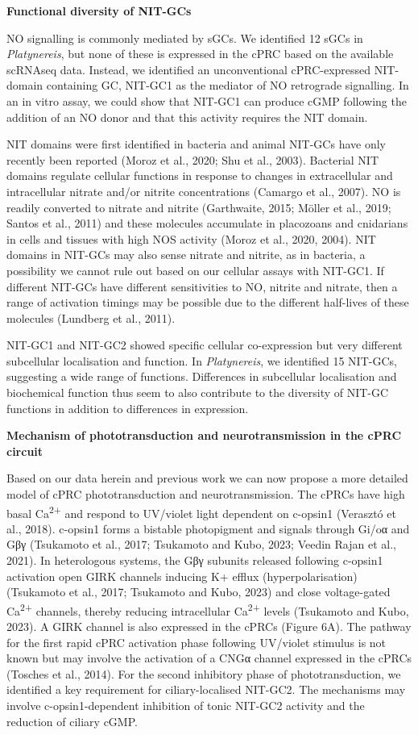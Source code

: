 \documentclass[
  10pt,
  onecolumn]{article}
\begin{document}
\textbf{Functional diversity of NIT-GCs}

NO signalling is commonly mediated by sGCs. We identified 12 sGCs in
\emph{Platynereis}, but none of these is expressed in the cPRC based on
the available scRNAseq data. Instead, we identified an unconventional
cPRC-expressed NIT-domain containing GC, NIT-GC1 as the mediator of NO
retrograde signalling. In an in vitro assay, we could show that NIT-GC1
can produce cGMP following the addition of an NO donor and that this
activity requires the NIT domain.

NIT domains were first identified in bacteria and animal NIT-GCs have
only recently been reported (Moroz et al., 2020; Shu et al., 2003).
Bacterial NIT domains regulate cellular functions in response to changes
in extracellular and intracellular nitrate and/or nitrite concentrations
(Camargo et al., 2007). NO is readily converted to nitrate and nitrite
(Garthwaite, 2015; Möller et al., 2019; Santos et al., 2011) and these
molecules accumulate in placozoans and cnidarians in cells and tissues
with high NOS activity (Moroz et al., 2020, 2004). NIT domains in
NIT-GCs may also sense nitrate and nitrite, as in bacteria, a
possibility we cannot rule out based on our cellular assays with
NIT-GC1. If different NIT-GCs have different sensitivities to NO,
nitrite and nitrate, then a range of activation timings may be possible
due to the different half-lives of these molecules (Lundberg et al.,
2011).

NIT-GC1 and NIT-GC2 showed specific cellular co-expression but very
different subcellular localisation and function. In \emph{Platynereis},
we identified 15 NIT-GCs, suggesting a wide range of functions.
Differences in subcellular localisation and biochemical function thus
seem to also contribute to the diversity of NIT-GC functions in addition
to differences in expression.

\textbf{Mechanism of phototransduction and neurotransmission in the cPRC
circuit}

Based on our data herein and previous work we can now propose a more
detailed model of cPRC phototransduction and neurotransmission. The
cPRCs have high basal Ca\textsuperscript{2+} and respond to UV/violet
light dependent on c-opsin1 (Verasztó et al., 2018). c-opsin1 forms a
bistable photopigment and signals through Gi/oα and Gβγ (Tsukamoto et
al., 2017; Tsukamoto and Kubo, 2023; Veedin Rajan et al., 2021). In
heterologous systems, the Gβγ subunits released following c-opsin1
activation open GIRK channels inducing K+ efflux (hyperpolarisation)
(Tsukamoto et al., 2017; Tsukamoto and Kubo, 2023) and close
voltage-gated Ca\textsuperscript{2+} channels, thereby reducing
intracellular Ca\textsuperscript{2+} levels (Tsukamoto and Kubo, 2023).
A GIRK channel is also expressed in the cPRCs (Figure 6A). The pathway
for the first rapid cPRC activation phase following UV/violet stimulus
is not known but may involve the activation of a CNGα channel expressed
in the cPRCs (Tosches et al., 2014). For the second inhibitory phase of
phototransduction, we identified a key requirement for ciliary-localised
NIT-GC2. The mechanisms may involve c-opsin1-dependent inhibition of
tonic NIT-GC2 activity and the reduction of ciliary cGMP.
\end{document}
